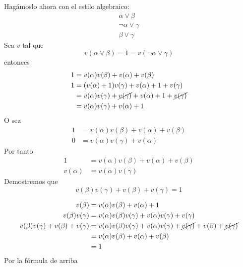 \begin{ejercicio*}
\begin{enumerate}
        Hagámoslo ahora con el estilo algebraico:
        \begin{equation*}
            \begin{array}{c}
                \alpha\lor\beta \\
                \lnot\alpha\lor\gamma \\
                \hline
                \beta\lor\gamma
            \end{array}
        \end{equation*}
        Sea $v$ tal que
        \begin{equation*}
            v(\alpha\lor\beta)=1=v(\lnot\alpha\lor\gamma)
        \end{equation*}
        entonces
        \begin{align*}
            1 &= v(\alpha)v(\beta)+v(\alpha)+v(\beta) \\
            1 &= (v(\alpha)+1)v(\gamma) + v(\alpha) + 1 + v(\gamma) \\
              &= v(\alpha)v(\gamma)+\cancel{v(\gamma)}+v(\alpha)+1+\cancel{v(\gamma)} \\
              &= v(\alpha)v(\gamma)+v(\alpha)+1
        \end{align*}
        O sea
        \begin{align*}
            1 &= v(\alpha)v(\beta) + v(\alpha) + v(\beta) \\
            0 &= v(\alpha)v(\gamma)+v(\alpha)
        \end{align*}
        Por tanto
        \begin{align*}
            1 &= v(\alpha)v(\beta) + v(\alpha) + v(\beta) \\
            v(\alpha) &= v(\alpha)v(\gamma)
        \end{align*}
        Demostremos que 
        \begin{equation*}
            v(\beta)v(\gamma)+v(\beta)+v(\gamma) = 1
        \end{equation*}

        \begin{align*}
            v(\beta) &= v(\alpha)v(\beta)+v(\alpha)+1 \\
            v(\beta)v(\gamma) &= v(\alpha)v(\beta)v(\gamma) + v(\alpha)v(\gamma) + v(\gamma) \\
            v(\beta)v(\gamma) + v(\beta) + v(\gamma) &= v(\alpha)v(\beta)v(\gamma) + v(\alpha)v(\gamma) + \cancel{v(\gamma)} + v(\beta) + \cancel{v(\gamma)} \\
                                                     &= v(\alpha)v(\beta) + v(\alpha) + v(\beta) \\
                                                     &= 1
        \end{align*}
        Por la fórmula de arriba

\end{enumerate}

\end{ejercicio*}

